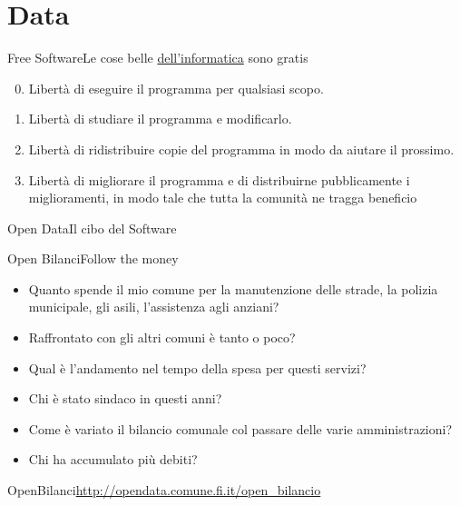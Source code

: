 \documentclass[italian,compress,red]{beamer}
\begin{document}
  
\section{Data}

\begin{frame}[<+->]{Free Software}{Le cose belle \underline{dell'informatica} sono gratis}
\begin{enumerate}
\setcounter{enumi}{-1}
 \item Libertà di eseguire il programma per qualsiasi scopo.
 \item Libertà di studiare il programma e modificarlo.
 \item Libertà di ridistribuire copie del programma in modo da aiutare il prossimo.
 \item Libertà di migliorare il programma e di distribuirne pubblicamente i miglioramenti, in modo tale che tutta la comunità ne tragga beneficio
\end{enumerate}

\end{frame}

\begin{frame}{Open Data}{Il cibo del Software}

\begin{center}
\end{center}
\end{frame}

\begin{frame}[<+->]{Open Bilanci}{Follow the money}
\begin{itemize}
 \item Quanto spende il mio comune per la manutenzione delle strade, la polizia municipale, gli asili, l'assistenza agli anziani?
 \item Raffrontato con gli altri comuni è tanto o poco?
 \item Qual è l'andamento nel tempo della spesa per questi servizi?
 \item Chi è stato sindaco in questi anni?
 \item Come è variato il bilancio comunale col passare delle varie amministrazioni? 
 \item Chi ha accumulato più debiti?
\end{itemize}
 
\end{frame}

\begin{frame}{OpenBilanci}{\url{http://opendata.comune.fi.it/open_bilancio}}
\begin{center}
\end{center}
\end{frame}
\end{document}
